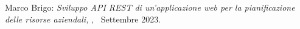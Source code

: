 \clearpage
{}
\thispagestyle{empty}

\hfill
\vfill

\noindent Marco Brigo: \textit{Sviluppo API REST di un'applicazione web per la pianificazione delle risorse aziendali,}
\myDegree,
\textcopyright\ Settembre 2023.
